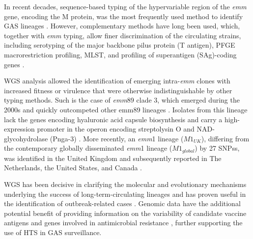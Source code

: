 In recent decades, sequence-based typing of the hypervariable region of the \textit{emm} gene, encoding the M protein, was the most frequently used method to identify \ac{GAS} lineages \cite{beall_sequencing_1996}. However, complementary methods have long been used, which, together with \textit{emm} typing, allow finer discrimination of the circulating strains, including serotyping of the major backbone pilus protein (T antigen), \ac{PFGE} macrorestriction profiling, \ac{MLST}, and profiling of superantigen (SAg)-coding genes \cite{carrico_illustration_2006, friaes_superantigen_2013, enright_multilocus_2001}.

\ac{WGS} analysis allowed the identification of emerging intra-\textit{emm} clones with increased fitness or virulence that were otherwise indistinguishable by other typing methods. Such is the case of \textit{emm}89 clade 3, which emerged during the 2000s and quickly outcompeted other emm89 lineages \cite{friaes_emergence_2015, turner_emergence_2015, zhu_molecular_2015}. Isolates from this lineage lack the genes encoding hyaluronic acid capsule biosynthesis and carry a high-expression promoter in the operon encoding streptolysin O and NAD-glycohydrolase (Pnga-3) \cite{turner_emergence_2015, zhu_trading_2015}. More recently, an \textit{emm}1 lineage ($M1_{UK}$), differing from the contemporary globally disseminated \textit{emm}1 lineage ($M1_{global}$) by 27 \acp{SNP}s, was identified in the United Kingdom \cite{lynskey_emergence_2019} and subsequently reported in The Netherlands, the United States, and Canada \cite{rumke_dominance_2020, li_m1uk_2020, demczuk_identification_2019}.

\ac{WGS} has been decisive in clarifying the molecular and evolutionary mechanisms underlying the success of long-term-circulating lineages \cite{nasser_evolutionary_2014, beres_molecular_2010} and has proven useful in the identification of outbreak-related cases \cite{turner_community_2017, coelho_genomic_2019}. Genomic data have the additional potential benefit of providing information on the variability of candidate vaccine antigens and genes involved in antimicrobial resistance \cite{davies_atlas_2019, beres_integrative_2022}, further supporting the use of \ac{HTS} in \ac{GAS} surveillance.

